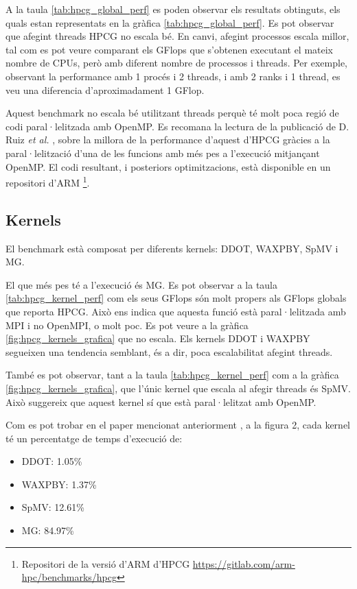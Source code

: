 A la taula \ref{tab:hpcg_global_perf} es poden observar els resultats obtinguts, els quals estan representats en la gràfica \ref{tab:hpcg_global_perf}. Es pot observar que afegint threads HPCG no escala bé. En canvi, afegint processos escala millor, tal com es pot veure comparant els GFlops que s'obtenen executant el mateix nombre de CPUs, però amb diferent nombre de processos i threads. Per exemple, observant la performance amb 1 procés i 2 threads, i amb 2 ranks i 1 thread, es veu una diferencia d'aproximadament 1 GFlop.

Aquest benchmark no escala bé utilitzant threads perquè té molt poca regió de codi paral·lelitzada amb OpenMP. 
Es recomana la lectura de la publicació de D. Ruiz \textit{et al.} \cite{ruiz_hpcg_nodate}, sobre la millora de la performance d'aquest d'HPCG gràcies a la paral·lelització d'una de les funcions amb més pes a l'execució mitjançant OpenMP. 
El codi resultant, i posteriors optimitzacions, està disponible en un repositori d'ARM 
\footnote{Repositori de la versió d'ARM d'HPCG \url{https://gitlab.com/arm-hpc/benchmarks/hpcg}}.


\subsection{Kernels}
El benchmark està composat per diferents kernels: DDOT, WAXPBY, SpMV i MG. 

El que més pes té a l'execució és MG. Es pot observar a la taula \ref{tab:hpcg_kernel_perf} com els seus GFlops són molt propers als GFlops globals que reporta HPCG. 
Això ens indica que aquesta funció està paral·lelitzada amb MPI i no OpenMPI, o molt poc. Es pot veure a la gràfica \ref{fig:hpcg_kernels_grafica} que no escala. 
Els kernels DDOT i WAXPBY segueixen una tendencia semblant, és a dir, poca escalabilitat afegint threads.

També es pot observar, tant a la taula \ref{tab:hpcg_kernel_perf} com a la gràfica \ref{fig:hpcg_kernels_grafica}, que l'únic kernel que escala al afegir threads és SpMV. Això suggereix que aquest kernel sí que està paral·lelitzat amb OpenMP.

Com es pot trobar en el paper mencionat anteriorment \cite{ruiz_hpcg_nodate}, a la figura 2, cada kernel té un percentatge de temps d'execució de:
\begin{itemize}
    \item DDOT:         1.05\%
    \item WAXPBY:       1.37\%
    \item SpMV:         12.61\%
    \item MG:           84.97\%
\end{itemize}

